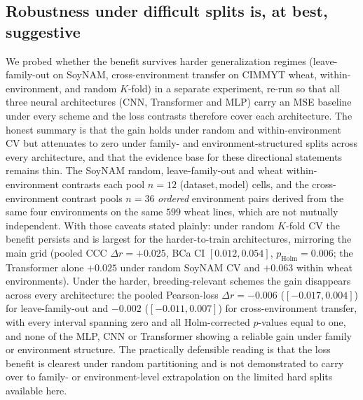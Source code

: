 \subsection{Robustness under difficult splits is, at best, suggestive}
We probed whether the benefit survives harder generalization regimes
(leave-family-out on SoyNAM, cross-environment transfer on CIMMYT wheat,
within-environment, and random $K$-fold) in a separate experiment, re-run so that
all three neural architectures (CNN, Transformer and MLP) carry an MSE baseline
under every scheme and the loss contrasts therefore cover each architecture. The
honest summary is that the gain holds under random and within-environment CV but
attenuates to zero under family- and environment-structured splits across every
architecture, and that the evidence base for these directional statements remains
thin. The SoyNAM random, leave-family-out and wheat within-environment contrasts
each pool $n=12$ (dataset,\,model) cells, and the cross-environment contrast pools
$n=36$ \emph{ordered} environment pairs derived from the same four environments on
the same $599$ wheat lines, which are not mutually independent. With those caveats
stated plainly: under random $K$-fold CV the benefit persists and is largest for
the harder-to-train architectures, mirroring the main grid (pooled CCC $\Delta r =
+0.025$, BCa CI $[0.012,0.054]$, $p_{\mathrm{Holm}}=0.006$; the Transformer alone
$+0.025$ under random SoyNAM CV and $+0.063$ within wheat environments). Under the
harder, breeding-relevant schemes the gain disappears across every architecture:
the pooled Pearson-loss $\Delta r=-0.006$ ($[-0.017,0.004]$) for leave-family-out
and $-0.002$ ($[-0.011,0.007]$) for cross-environment transfer, with every interval
spanning zero and all Holm-corrected $p$-values equal to one, and none of the MLP,
CNN or Transformer showing a reliable gain under family or environment structure.
The practically defensible reading is that the loss benefit is clearest under random
partitioning and is not demonstrated to carry over to family- or environment-level
extrapolation on the limited hard splits available here.

